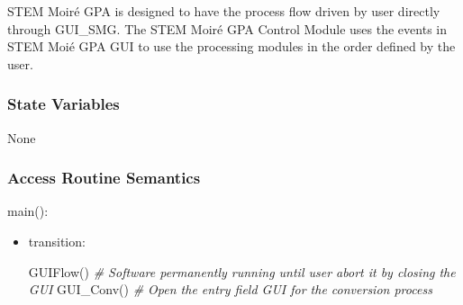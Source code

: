 \documentclass[12pt, titlepage]{article}
\newcommand{\progname}{STEM Moir{\'e} GPA}
\begin{document}
\progname{} is designed to have the process flow driven by user directly through GUI{\_}SMG. The STEM Moir{\'e} GPA Control Module uses the events in STEM Moi{\'e} GPA GUI to use the processing modules in the order defined by the user.

\subsubsection{State Variables}

None

\subsubsection{Access Routine Semantics}

\noindent main():
\begin{itemize}
\item transition:

GUIFlow()
\noindent\textit{{\#} Software permanently running until user abort it by closing the GUI} \medskip
GUI{\_}Conv()
\noindent\textit{{\#} Open the entry field GUI for the conversion process} \medskip


\end{itemize}
\end{document}
